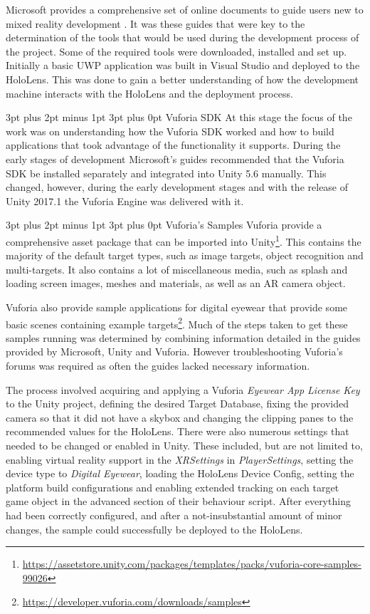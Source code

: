 \documentclass[12pt,a4paper,oneside]{article}
\makeatletter
\renewcommand\paragraph{\@startsection {paragraph}{1}{0mm} %
	                           {3pt plus 2pt minus 1pt} %
	                           {3pt plus 0pt} %
	                           {\normalfont}}
\renewcommand\subsubsection{\@startsection {subsubsection}{1}{0mm} %
	                           {3pt plus 2pt minus 1pt} %
	                           {3pt plus 0pt} %
	                           {\normalfont\bfseries}}
\makeatother
\begin{document}
Microsoft provides a comprehensive set of online documents to guide users new to mixed reality development \cite{hololensdev}. It was these guides that were key to the determination of the tools that would be used during the development process of the project. Some of the required tools were downloaded, installed and set up. Initially a basic UWP application was built in Visual Studio and deployed to the HoloLens. This was done to gain a better understanding of how the development machine interacts with the HoloLens and the deployment process.

\subsubsection{Vuforia SDK}
At this stage the focus of the work was on understanding how the Vuforia SDK worked and how to build applications that took advantage of the functionality it supports. During the early stages of development Microsoft's guides recommended that the Vuforia SDK be installed separately and integrated into Unity 5.6 manually. This changed, however, during the early development stages and with the release of Unity 2017.1 the Vuforia Engine was delivered with it.

\paragraph{Vuforia's Samples}
Vuforia provide a comprehensive asset package that can be imported into Unity\footnote{\url{https://assetstore.unity.com/packages/templates/packs/vuforia-core-samples-99026}}. This contains the majority of the default target types, such as image targets, object recognition and multi-targets. It also contains a lot of miscellaneous media, such as splash and loading screen images, meshes and materials,  as well as an AR camera object.

Vuforia also provide sample applications for digital eyewear that provide some basic scenes containing example targets\footnote{\url{https://developer.vuforia.com/downloads/samples}}. Much of the steps taken to get these samples running was determined by combining information detailed in the guides provided by Microsoft, Unity and Vuforia. However troubleshooting Vuforia's forums was required as often the guides lacked necessary information. 

The process involved acquiring and applying a Vuforia \textit{Eyewear App License Key} to the Unity project, defining the desired Target Database, fixing the provided camera so that it did not have a skybox and changing the clipping panes to the recommended values for the HoloLens. There were also numerous settings that needed to be changed or enabled in Unity. These included, but are not limited to, enabling virtual reality support in the \textit{XRSettings} in \textit{PlayerSettings}, setting the device type to \textit{Digital Eyewear}, loading the HoloLens Device Config, setting the platform build configurations and enabling extended tracking on each target game object in the advanced section of their behaviour script. After everything had been correctly configured, and after a not-insubstantial amount of minor changes, the sample could successfully be deployed to the HoloLens.
\end{document}
